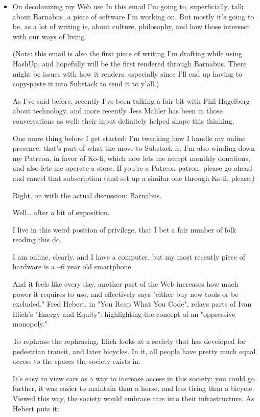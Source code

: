 \documentclass[11pt]{article}
\begin{document}
\begin{itemize}
\item On decolonizing my Web use
\label{sec:org0e711c6}
In this email I'm going to, superficially, talk about Barnabus, a piece of software I'm working on. But mostly it's going to be, as a lot of writing is, about culture, philosophy, and how those intersect with our ways of living.

(Note: this email is also the first piece of writing I'm drafting while using HashUp, and hopefully will be the first rendered through Barnabus. There might be issues with how it renders, especially since I'll end up having to copy-paste it into Substack to send it to y'all.)

As I've said before, recently I've been talking a fair bit with Phil Hagelberg about technology, and more recently Jess Mahler has been in those conversations as well: their input definitely helped shape this thinking.

One more thing before I get started: I'm tweaking how I handle my online presence: that's part of what the move to Substack is. I'm also winding down my Patreon, in favor of Ko-fi, which now lets me accept monthly donations, and also lets me operate a store. If you're a Patreon patron, please go ahead and cancel that subscription (and set up a similar one through Ko-fi, please.)

Right, on with the actual discussion: Barnabus.

Well\ldots{} after a bit of exposition.

I live in this weird position of privilege, that I bet a fair number of folk reading this do.

I am online, clearly, and I have a computer, but my most recently piece of hardware is a \textasciitilde{}6 year old smartphone.

And it feels like every day, another part of the Web increases how much power it requires to use, and effectively says "either buy new tools or be excluded." Fred Hebert, in "You Reap What You Code", relays parts of Ivan Illich's "Energy and Equity": highlighting the concept of an "oppressive monopoly."

To rephrase the rephrasing, Illich looks at a society that has developed for pedestrian transit, and later bicycles. In it, all people have pretty much equal access to the spaces the society exists in.

It's easy to view cars as a way to increase access in this society: you could go further, it was easier to maintain than a horse, and less tiring than a bicycle. Viewed this way, the society would embrace cars into their infrastructure. As Hebert puts it:


\end{itemize}
\end{document}
